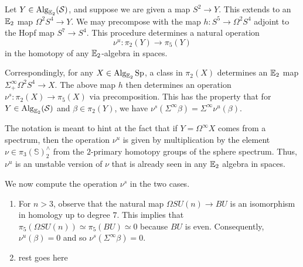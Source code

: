 \begin{obs}Let $Y\in \operatorname{\text{Alg}}_{\operatorname{\mathbb{E}}_2}(\operatorname{\mathcal{S}})$, and suppose we are given a map $ S^2\to Y$.  This extends to an $\operatorname{\mathbb{E}}_2$ map $\Omega^2 S^4 \to Y.$  We may precompose with the map $h: S^5 \to \Omega^2 S^4$ adjoint to the Hopf map $S^7\to S^4$.  This procedure determines a natural operation $$\nu^u: \pi_2(Y) \to \pi_5(Y)$$ in the homotopy of any $\operatorname{\mathbb{E}}_2$-algebra in spaces.  

Correspondingly, for any $X\in \operatorname{\text{Alg}}_{\operatorname{\mathbb{E}}_2}{\operatorname{\text{Sp}}}$, a class in $\pi_2(X)$ determines an $\operatorname{\mathbb{E}}_2$ map $\Sigma^{\infty}_+ \Omega^2 S^4 \to X$.  The above map $h$ then determines an operation $\nu^s :\pi_2(X) \to \pi_5(X)$ via precomposition.  This has the property that for $Y\in \operatorname{\text{Alg}}_{\operatorname{\mathbb{E}}_2}(\operatorname{\mathcal{S}})$ and $\beta \in \pi_2(Y)$, we have $\nu^s(\Sigma^{\infty} \beta) = \Sigma^{\infty} \nu^u (\beta).$
\end{obs}

\begin{rmk} \label{rmk:multnu}
The notation is meant to hint at the fact that if $Y = \Omega^\infty X$ comes from a spectrum, then the operation $\nu^u$ is given by multiplication by the element $\nu \in \pi_3(\mathbb{S})^{\wedge}_2$ from the $2$-primary homotopy groups of the sphere spectrum.  Thus, $\nu^u$ is an unstable version of $\nu$ that is already seen in any $\operatorname{\mathbb{E}}_2$ algebra in spaces.    
\end{rmk}

We now compute the operation $\nu^s$ in the two cases.  
\begin{enumerate}
\item For $n>3$, observe that the natural map $\Omega SU(n) \to BU$ is an isomorphism in homology up to degree $7$.  This implies that $\pi_5(\Omega SU(n)) \simeq \pi_5(BU) \simeq 0$ because $BU$ is even.  Consequently, $\nu^u(\beta) = 0$ and so $\nu^s(\Sigma^{\infty} \beta) = 0.$  

\item rest goes here

\end{enumerate}

